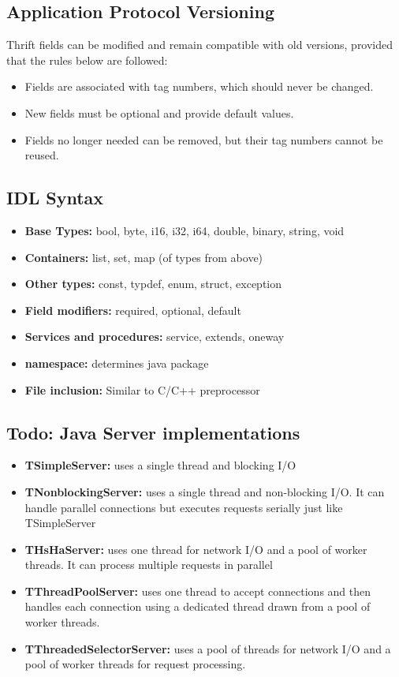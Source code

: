 \documentclass[12pt,titlepage]{article}
\begin{document}
    \subsection{Application Protocol Versioning}
      Thrift fields can be modified and remain compatible with old versions, provided that the rules below are followed:
      \begin{itemize}
        \item Fields are associated with tag numbers, which should never be changed.
        \item New fields must be optional and provide default values.
        \item Fields no longer needed can be removed, but their tag numbers cannot be reused.
      \end{itemize}
	
	\subsection{IDL Syntax}
      \begin{itemize}
        \item \textbf{Base Types:} bool, byte, i16, i32, i64, double, binary, string, void
        \item \textbf{Containers:} list, set, map (of types from above)
        \item \textbf{Other types:} const, typdef, enum, struct, exception
        \item \textbf{Field modifiers:} required, optional, default
        \item \textbf{Services and procedures:} service, extends, oneway
        \item \textbf{namespace:} determines java package
        \item \textbf{File inclusion:} Similar to C/C++ preprocessor
      \end{itemize}	
      
      \subsection{Todo: Java Server implementations}
      \begin{itemize}
        \item \textbf{TSimpleServer:}  uses a single thread and blocking I/O
        \item \textbf{TNonblockingServer:}  uses a single thread and non-blocking I/O. It can handle parallel connections but executes requests serially just like TSimpleServer
        \item \textbf{THsHaServer:}  uses one thread for network I/O and a pool of worker threads. It can process multiple requests in parallel
        \item \textbf{TThreadPoolServer:} uses one thread to accept connections and then handles each connection using a dedicated thread drawn from a pool of worker threads. 
        \item \textbf{TThreadedSelectorServer:}  uses a pool of threads for network I/O and a pool of worker threads for request processing.
        
      \end{itemize}	
	
\end{document}
